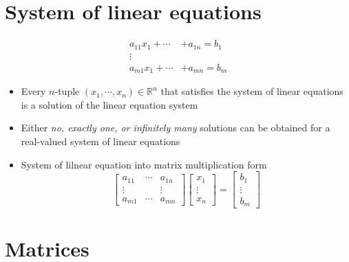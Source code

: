\documentclass[12pt]{article}
\theoremstyle{definition}
\begin{document}
    \section{System of linear equations}
        \begin{align*}
            a_{11}x_1 + \cdots &+ a_{1n} = b_1\\
            \vdots&\\
            a_{m1}x_1 + \cdots &+ a_{mn} = b_m
        \end{align*}
        \begin{itemize}
            \item Every $n$-tuple $(x_1, \cdots, x_n) \in \mathbb{R}^n$ that 
                satisfies the system of linear equations is a solution of the
                linear equation system
            \item Either \textit{no, exactly one, or infinitely many} solutions can be 
                obtained for a real-valued system of linear equations
            \item System of lilnear equation into matrix multiplication form
            \begin{equation*}
                \left[
                    \begin{matrix}
                        a_{11} & \cdots & a_{1n}\\
                        \vdots & & \vdots\\
                        a_{m1} & \cdots & a_{mn}
                    \end{matrix}
                \right]
                \left[
                    \begin{matrix}
                        x_1\\
                        \vdots\\
                        x_n
                    \end{matrix}
                \right]
                =
                \left[
                    \begin{matrix}
                        b_1\\
                        \vdots\\
                        b_m
                    \end{matrix}
                \right]
            \end{equation*}
        \end{itemize}
    \newpage
    \section{Matrices}
\end{document}
